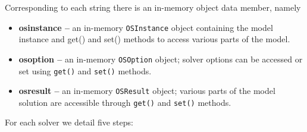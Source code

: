 \documentclass[11pt]{article}
\renewcommand{\{}{{\char"7B}}
\renewcommand{\}}{{\char"7D}}
\renewcommand{\^}{{\char"0D}}
\renewcommand{\'}{{\char"0D}}
\begin{document}
Corresponding to each string there is an in-memory object data member, namely

\begin{itemize}
\item {\bf osinstance --}  an in-memory {\tt OSInstance} object containing the model instance
and get() and set() methods to access various parts of the model.


\item {\bf osoption --} an in-memory {\tt OSOption} object; solver options can be accessed or 
set using {\tt get()} and {\tt set()} methods.


\item {\bf osresult --}  an in-memory {\tt OSResult} object; various parts of the model solution  
are accessible through {\tt get()} and {\tt set()} methods.
\end{itemize}


For each solver we detail five steps:
\end{document}
